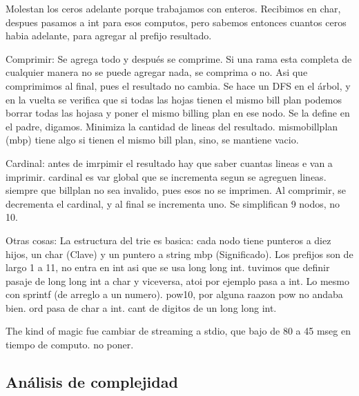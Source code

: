 Molestan los ceros adelante porque trabajamos con enteros. Recibimos en char,
despues pasamos a int para esos computos, pero sabemos entonces cuantos ceros
habia adelante, para agregar al prefijo resultado.

Comprimir: Se agrega todo y después se comprime. Si una rama esta completa de cualquier
manera no se puede agregar nada, se comprima o no. Asi que comprimimos al final, pues
el resultado no cambia. Se hace un DFS en el árbol, y en la vuelta se verifica
que si todas las hojas tienen el mismo bill plan podemos borrar todas las hojasa y
poner el mismo billing plan en ese nodo. Se la define en el padre, digamos. Minimiza
la cantidad de lineas del resultado. mismobillplan (mbp) tiene algo si tienen el mismo
bill plan, sino, se mantiene vacio.

Cardinal: antes de imrpimir el resultado hay que saber cuantas lineas e van a imprimir.
cardinal es var global que se incrementa segun se agreguen lineas. siempre que billplan
no sea invalido, pues esos no se imprimen. Al comprimir, se decrementa el cardinal, y al final se
incrementa uno. Se simplifican 9 nodos, no 10.


Otras cosas: La estructura del trie es basica: cada nodo tiene punteros a diez hijos, un char (Clave) y un
puntero a string mbp (Significado). Los prefijos son de largo 1 a 11, no entra en int
asi que se usa long long int. tuvimos que definir pasaje de long long int a char y viceversa,
atoi por ejemplo pasa a int. Lo mesmo con sprintf (de arreglo a un numero). pow10, por alguna raazon
pow no andaba bien. ord pasa de char a int. cant de digitos de un long long int.

The kind of magic fue cambiar de streaming a stdio, que bajo de 80 a 45 mseg en tiempo de computo. no poner.

\subsection*{Análisis de complejidad}
